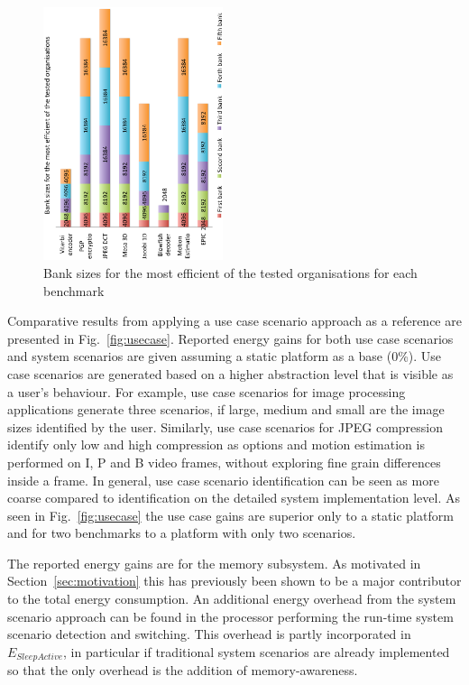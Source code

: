 \documentclass[a4paper,conference]{IEEEtran}
\begin{document}
\begin{figure}[!t]
\centering
\includegraphics[angle=270, width=0.47\textwidth]{Images/banks.ps}
\caption{Bank sizes for the most efficient of the tested organisations for each benchmark}
\label{fig:banks}
\end{figure}


Comparative results from applying a use case scenario approach as a reference are presented in Fig.~\ref{fig:usecase}. Reported energy gains for both use case scenarios and system scenarios are given assuming a static platform as a base (0\%). Use case scenarios are generated based on a higher abstraction level that is visible as a user's behaviour. For example, use case scenarios for image processing applications generate three scenarios, if large, medium and small are the image sizes identified by the user. Similarly, use case scenarios for JPEG compression identify only low and high compression as options and motion estimation is performed on I, P and B video frames, without exploring fine grain differences inside a frame. In general, use case scenario identification can be seen as more coarse compared to identification on the detailed system implementation level. As seen in Fig.~\ref{fig:usecase} the use case gains are superior only to a static platform and for two benchmarks to a platform with only two scenarios.  

The reported energy gains are for the memory subsystem. As motivated in Section~\ref{sec:motivation} this has previously been shown to be a major contributor to the total energy consumption. An additional energy overhead from the system scenario approach can be found in the processor performing the run-time system scenario detection and switching. This overhead is partly incorporated in $E_{SleepActive}$, in particular if traditional system scenarios are already implemented so that the only overhead is the addition of memory-awareness.
\end{document}
